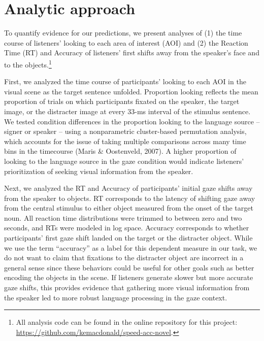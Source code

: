 \documentclass[man,floatsintext]{apa6}
\let\rmarkdownfootnote\footnote%
\def\footnote{\protect\rmarkdownfootnote}
\begin{document}
\section{Analytic approach}\label{analytic-approach}

To quantify evidence for our predictions, we present analyses of (1) the
time course of listeners' looking to each area of interest (AOI) and (2)
the Reaction Time (RT) and Accuracy of listeners' first shifts away from
the speaker's face and to the objects.\footnote{All analysis code can be
  found in the online repository for this project:
  \url{https://github.com/kemacdonald/speed-acc-novel}.}

First, we analyzed the time course of participants' looking to each AOI
in the visual scene as the target sentence unfolded. Proportion looking
reflects the mean proportion of trials on which participants fixated on
the speaker, the target image, or the distracter image at every 33-ms
interval of the stimulus sentence. We tested condition differences in
the proportion looking to the language source -- signer or speaker --
using a nonparametric cluster-based permutation analysis, which accounts
for the issue of taking multiple comparisons across many time bins in
the timecourse (Maris \& Oostenveld, 2007). A higher proportion of
looking to the language source in the gaze condition would indicate
listeners' prioritization of seeking visual information from the
speaker.

Next, we analyzed the RT and Accuracy of participants' initial gaze
shifts away from the speaker to objects. RT corresponds to the latency
of shifting gaze away from the central stimulus to either object
measured from the onset of the target noun. All reaction time
distributions were trimmed to between zero and two seconds, and RTs were
modeled in log space. Accuracy corresponds to whether participants'
first gaze shift landed on the target or the distracter object. While we
use the term \enquote{accuracy} as a label for this dependent measure in
our task, we do not want to claim that fixations to the distracter
object are incorrect in a general sense since these behaviors could be
useful for other goals such as better encoding the objects in the scene.
If listeners generate slower but more accurate gaze shifts, this
provides evidence that gathering more visual information from the
speaker led to more robust language processing in the gaze context.
\end{document}
